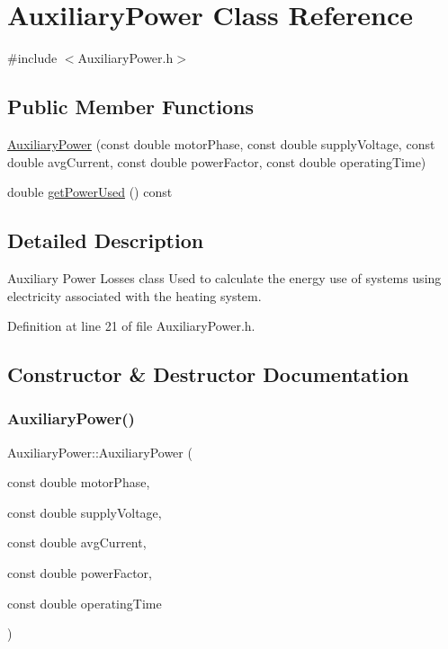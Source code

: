 \hypertarget{class_auxiliary_power}{}\section{Auxiliary\+Power Class Reference}
\label{class_auxiliary_power}


{\ttfamily \#include $<$Auxiliary\+Power.\+h$>$}

\subsection*{Public Member Functions}
\begin{DoxyCompactItemize}
\item 
\hyperlink{class_auxiliary_power_aef0d5c2c60a2481b16cc201ba2e69fe7}{Auxiliary\+Power} (const double motor\+Phase, const double supply\+Voltage, const double avg\+Current, const double power\+Factor, const double operating\+Time)
\item 
double \hyperlink{class_auxiliary_power_a824ece4e6bb789fceb1b55ecf2f678bd}{get\+Power\+Used} () const
\end{DoxyCompactItemize}


\subsection{Detailed Description}
Auxiliary Power Losses class Used to calculate the energy use of systems using electricity associated with the heating system. 

Definition at line 21 of file Auxiliary\+Power.\+h.



\subsection{Constructor \& Destructor Documentation}
\mbox{\label{class_auxiliary_power_aef0d5c2c60a2481b16cc201ba2e69fe7}} 
\subsubsection{\texorpdfstring{Auxiliary\+Power()}{AuxiliaryPower()}}
{\footnotesize\ttfamily Auxiliary\+Power\+::\+Auxiliary\+Power (\begin{DoxyParamCaption}\item[{const double}]{motor\+Phase,  }\item[{const double}]{supply\+Voltage,  }\item[{const double}]{avg\+Current,  }\item[{const double}]{power\+Factor,  }\item[{const double}]{operating\+Time }\end{DoxyParamCaption})\hspace{0.3cm}{\ttfamily [inline]}}

